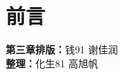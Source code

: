 \chapter*{前言}

\begin{tcolorbox}[title={\bfseries 参与排版成员}]
	 \textbf{第三章排版：}钱91 谢佳润\\
	 \textbf{整理：}化生81 高旭帆\\
\end{tcolorbox}

\newpage